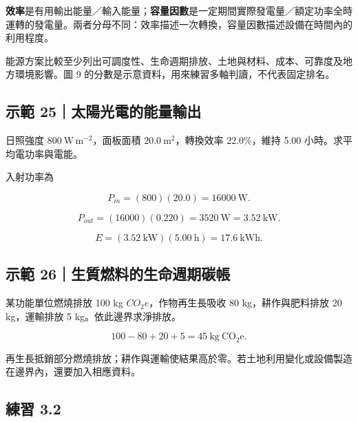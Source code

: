 \documentclass[11pt,a4paper]{article}
\begin{document}
\textbf{效率}是有用輸出能量／輸入能量；\textbf{容量因數}是一定期間實際發電量／額定功率全時運轉的發電量。兩者分母不同：效率描述一次轉換，容量因數描述設備在時間內的利用程度。

能源方案比較至少列出可調度性、生命週期排放、土地與材料、成本、可靠度及地方環境影響。圖 9 的分數是示意資料，用來練習多軸判讀，不代表固定排名。

\begin{HandoutWorkedExample}

\subsection{示範 25｜太陽光電的能量輸出}\label{ux793aux7bc4-25ux592aux967dux5149ux96fbux7684ux80fdux91cfux8f38ux51fa}

日照強度 \(800\ \mathrm{W\,m^{-2}}\)，面板面積 \(20.0\ \mathrm{m^2}\)，轉換效率 22.0\%，維持 5.00 小時。求平均電功率與電能。

入射功率為

\[
P_{in}=(800)(20.0)=16000\ \mathrm W.
\]

\[
P_{out}=(16000)(0.220)=3520\ \mathrm W=3.52\ \mathrm{kW}.
\]

\[
E=(3.52\ \mathrm{kW})(5.00\ \mathrm h)=17.6\ \mathrm{kWh}.
\]

\end{HandoutWorkedExample}

\begin{HandoutWorkedExample}

\subsection{示範 26｜生質燃料的生命週期碳帳}\label{ux793aux7bc4-26ux751fux8ceaux71c3ux6599ux7684ux751fux547dux9031ux671fux78b3ux5e33}

某功能單位燃燒排放 100 kg \(CO_2e\)，作物再生長吸收 80 kg，耕作與肥料排放 20 kg，運輸排放 5 kg。依此邊界求淨排放。

\[
100-80+20+5=45\ \mathrm{kg\ CO_2e}.
\]

再生長抵銷部分燃燒排放；耕作與運輸使結果高於零。若土地利用變化或設備製造在邊界內，還要加入相應資料。

\end{HandoutWorkedExample}

\subsection{練習 3.2}\label{ux7df4ux7fd2-3.2}
\end{document}
